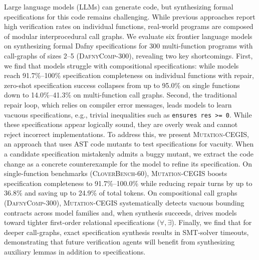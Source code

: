 Large language models (LLMs) can generate code, but synthesizing formal specifications for this code remains challenging. While previous approaches report high verification rates on individual functions, real-world programs are composed of modular interprocedural call graphs. We evaluate six frontier language models on synthesizing formal Dafny specifications for 300 multi-function programs with call-graphs of sizes 2--5 (\textsc{DafnyComp-300}), revealing two key shortcomings. First, we find that models struggle with compositional specifications: while models reach 91.7\%--100\% specification completeness on individual functions with repair, zero-shot specification success collapses from up to 95.0\% on single functions down to 14.0\%--41.3\% on multi-function call graphs. Second, the traditional repair loop, which relies on compiler error messages, leads models to learn vacuous specifications, e.g., trivial inequalities such as \texttt{ensures res >= 0}. While these specifications appear logically sound, they are overly weak and cannot reject incorrect implementations. To address this, we present \textsc{Mutation-CEGIS}, an approach that uses AST code mutants to test specifications for vacuity. When a candidate specification mistakenly admits a buggy mutant, we extract the code change as a concrete counterexample for the model to refine its specification. On single-function benchmarks (\textsc{CloverBench-60}), \textsc{Mutation-CEGIS} boosts specification completeness to 91.7\%--100.0\% while reducing repair turns by up to 36.8\% and saving up to 24.9\% of total tokens. On compositional call graphs (\textsc{DafnyComp-300}), \textsc{Mutation-CEGIS} systematically detects vacuous bounding contracts across model families and, when synthesis succeeds, drives models toward tighter first-order relational specifications ($\forall, \exists$). Finally, we find that for deeper call-graphs, exact specification synthesis results in SMT-solver timeouts, demonstrating that future verification agents will benefit from synthesizing auxiliary lemmas in addition to specifications.
